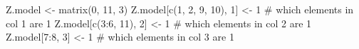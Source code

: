 \begin{Schunk}
\begin{Sinput}
 Z.model <- matrix(0, 11, 3)
 Z.model[c(1, 2, 9, 10), 1] <- 1 # which elements in col 1 are 1
 Z.model[c(3:6, 11), 2] <- 1 # which elements in col 2 are 1
 Z.model[7:8, 3] <- 1 # which elements in col 3 are 1
\end{Sinput}
\end{Schunk}
